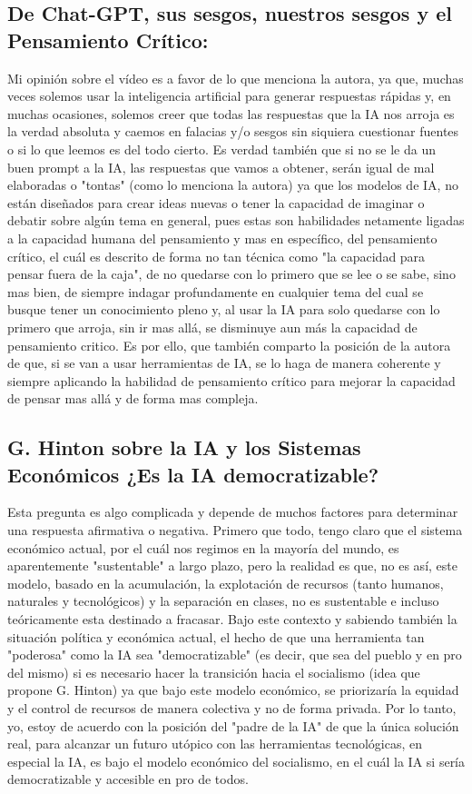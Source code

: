 \documentclass{article}
\begin{document}
\subsection{De Chat-GPT, sus sesgos, nuestros sesgos y el Pensamiento Crítico:}
\label{sec:org462da5e}
Mi opinión sobre el vídeo es a favor de lo que menciona la autora, ya
que, muchas veces solemos usar la inteligencia artificial
para generar respuestas rápidas y, en muchas ocasiones, solemos creer
que todas las respuestas que la IA nos arroja es la verdad absoluta y
caemos en falacias y/o sesgos sin siquiera cuestionar fuentes o si lo
que leemos es del todo cierto. Es verdad también que si no se le
da un buen prompt a la IA, las respuestas que vamos a obtener, serán
igual de mal elaboradas o "tontas" (como lo menciona la autora) ya que
los modelos de IA, no están diseñados para crear ideas nuevas o tener
la capacidad de imaginar o debatir sobre algún tema en general, pues
estas son habilidades netamente ligadas a la capacidad humana del
pensamiento y mas en específico, del pensamiento crítico, el cuál es
descrito de forma no tan técnica como "la capacidad para pensar fuera
de la caja", de no quedarse con lo primero que se lee o se sabe, sino
mas bien, de siempre indagar profundamente en cualquier tema del cual
se busque tener un conocimiento pleno y, al usar la IA para solo
quedarse con lo primero que arroja, sin ir mas allá, se disminuye aun
más la capacidad de pensamiento critico. Es por ello, que también
comparto la posición de la autora de que, si se van a usar
herramientas de IA, se lo haga de manera coherente y siempre aplicando
la habilidad de pensamiento crítico para mejorar la capacidad de
pensar mas allá y de forma mas compleja.
\subsection{G. Hinton sobre la IA y los Sistemas Económicos ¿Es la IA democratizable?}
\label{sec:org5b091b7}
Esta pregunta es algo complicada y depende de muchos factores para
determinar una respuesta afirmativa o negativa. Primero que todo,
tengo claro que el sistema económico actual, por el cuál nos regimos
en la mayoría del mundo, es aparentemente "sustentable" a largo plazo,
pero la realidad es que, no es así, este modelo, basado en la
acumulación, la explotación de recursos (tanto humanos, naturales y
tecnológicos) y la separación en clases, no es sustentable e incluso
teóricamente esta destinado a fracasar. Bajo este contexto y sabiendo
también la situación política y económica actual, el hecho de que una
herramienta tan "poderosa" como la IA sea "democratizable" (es decir,
que sea del pueblo y en pro del mismo) si es necesario hacer la
transición hacia el socialismo (idea que propone G. Hinton) ya que
bajo este modelo económico, se priorizaría la equidad y el control de
recursos de manera colectiva y no de forma privada. Por lo tanto, yo,
estoy de acuerdo con la posición del "padre de la IA" de que la única
solución real, para alcanzar un futuro utópico con las herramientas
tecnológicas, en especial la IA, es bajo el modelo económico del
socialismo, en el cuál la IA si sería democratizable y accesible en
pro de todos.
\end{document}
